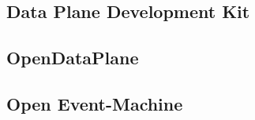 \subsection{Data Plane Development Kit}
\subsection{OpenDataPlane}
\subsection{Open Event-Machine}





